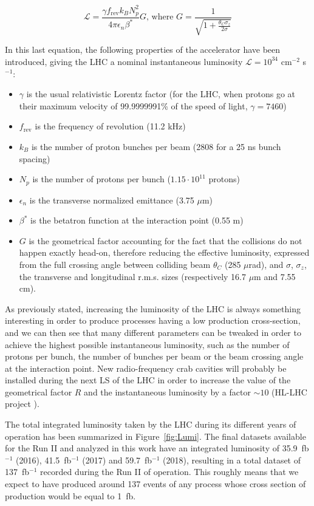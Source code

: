 \documentclass[a4paper, 10pt, openright]{report}
\begin{document}
\begin{equation}
\label{eq:Luminosity}
\mathcal{L} = \frac{\gamma f_{\text{rev}} k_B N_p^2}{4 \pi \epsilon_n \beta^*}G \text{,  where } G = \frac{1}{\sqrt{1+\frac{\theta_C \sigma_z}{2 \sigma}}}
\end{equation}

In this last equation, the following properties of the accelerator have been introduced, giving the \ac{LHC} a nominal instantaneous luminosity $\mathcal{L} = 10^{34}$ cm$^{-2}$ s$^{-1}$:
\begin{itemize}
\item $\gamma$ is the usual relativistic Lorentz factor (for the \ac{LHC}, when protons go at their maximum velocity of 99.9999991\% of the speed of light, $\gamma = 7460$)
\item $f_{\text{rev}}$ is the frequency of revolution (11.2 kHz)
\item $k_B$ is the number of proton bunches per beam (2808 for a 25 ns bunch spacing)
\item $N_p$ is the number of protons per bunch ($1.15 \cdot 10^{11}$ protons)
\item $\epsilon_n$ is the transverse normalized emittance (3.75 $\mu$m)
\item $\beta^*$ is the betatron function at the interaction point (0.55 m)
\item $G$ is the geometrical factor accounting for the fact that the collisions do not happen exactly head-on, therefore reducing the effective luminosity, expressed from the full crossing angle between colliding beam $\theta_C$ (285 $\mu$rad), and $\sigma$, $\sigma_z$, the transverse and longitudinal r.m.s. sizes (respectively 16.7 $\mu$m and 7.55 cm).
\end{itemize}

As previously stated, increasing the luminosity of the \ac{LHC} is always something interesting in order to produce processes having a low production cross-section, and we can then see that many different parameters can be tweaked in order to achieve the highest possible instantaneous luminosity, such as the number of protons per bunch, the number of bunches per beam or the beam crossing angle at the interaction point. New radio-frequency crab cavities will probably be installed during the next \ac{LS} of the \ac{LHC} in order to increase the value of the geometrical factor $R$ and the instantaneous luminosity by a factor $\sim 10$ (HL-LHC project \cite{HLLHC}).

The total integrated luminosity taken by the \ac{LHC} during its different years of operation has been summarized in Figure~\ref{fig:Lumi}. The final datasets available for the Run II and analyzed in this work have an integrated luminosity of 35.9~fb$^{-1}$ (2016), 41.5~fb$^{-1}$ (2017) and 59.7~fb$^{-1}$ (2018), resulting in a total dataset of 137~fb$^{-1}$ recorded during the Run II of operation. This roughly means that we expect to have produced around 137 events of any process whose cross section of production would be equal to 1~fb.
\end{document}
